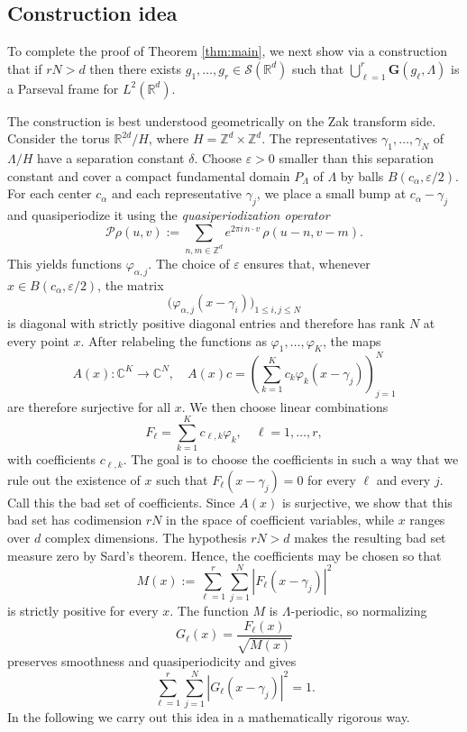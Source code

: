 \documentclass[reqno,a4paper,12pt]{amsart}
\numberwithin{equation}{section}
\newcommand\1{\mathds{1}}
\begin{document}
\subsection{Construction idea}\label{sec:geom_idea}
To complete the proof of Theorem \ref{thm:main}, we next show via a construction that if $rN > d$ then there exists $g_1,\dots,g_r\in \mathcal S(\mathbb R^d)$ such that
$
\bigcup_{\ell=1}^r \mathbf G(g_\ell,\Lambda)
$
is a Parseval frame for $L^2(\mathbb R^d)$.

The construction is best understood geometrically on the Zak transform side. Consider the torus $\mathbb R^{2d}/H$, where
$H=\mathbb Z^d\times \mathbb Z^d$.  The representatives
$\gamma_1,\dots,\gamma_N$ of $\Lambda/H$ have a separation constant $\delta$. Choose $\varepsilon>0$ smaller than this separation constant and cover a compact
fundamental domain $P_\Lambda$ of $\Lambda$ by balls $B(c_\alpha,\varepsilon/2)$.  For each
center $c_\alpha$ and each representative $\gamma_j$, we place a small bump at $c_\alpha-\gamma_j$ and quasiperiodize it using the \emph{quasiperiodization operator}
$$
\mathcal P\rho(u,v):=\sum_{n,m\in\mathbb Z^d}e^{2\pi i\,n\cdot v}\,\rho(u-n,v-m).
$$
This yields functions $\varphi_{\alpha,j}$.  The choice of $\varepsilon$ ensures that, whenever
$x\in B(c_\alpha,\varepsilon/2)$, the matrix
$$
    \bigl(\varphi_{\alpha,j}(x-\gamma_i)\bigr)_{1\leq i,j\leq N}
$$
is diagonal with strictly positive diagonal entries and therefore has rank $N$ at every point $x$.
After relabeling the functions as $\varphi_1,\dots,\varphi_K$, the maps
$$
A(x):\mathbb C^K\to \mathbb C^N, \quad A(x)c = \left( \sum_{k=1}^K c_k\varphi_k(x-\gamma_j) \right)_{j=1}^N
$$
are therefore surjective for all $x$.  We then choose linear
combinations
$$
F_\ell=\sum_{k=1}^K c_{\ell,k}\varphi_k, \quad \ell=1,\dots,r,
$$
with coefficients $c_{\ell,k}$. The goal is to choose the coefficients in such a way that we rule out the existence of $x$ such that $F_\ell(x-\gamma_j)=0$ for every $\ell$ and every $j$. Call this the bad set of coefficients. Since
$A(x)$ is surjective, we show that this bad set has codimension $rN$ in the space of coefficient
variables, while $x$ ranges over $d$ complex dimensions. The hypothesis $rN>d$ makes the resulting bad set measure zero by Sard's theorem.  Hence, the coefficients may be chosen so that
$$
M(x) := \sum_{\ell=1}^r\sum_{j=1}^N |F_\ell(x-\gamma_j)|^2
$$
is strictly positive for every $x$.  The function $M$ is $\Lambda$-periodic, so
normalizing
$$
G_\ell(x)=\frac{F_\ell(x)}{\sqrt{M(x)}}
$$
preserves smoothness and quasiperiodicity and gives
$$
\sum_{\ell=1}^r\sum_{j=1}^N |G_\ell(x-\gamma_j)|^2 = 1.
$$
In the following we carry out this idea in a mathematically rigorous way.
\end{document}
